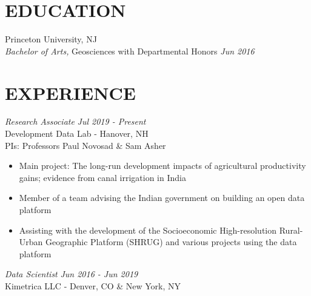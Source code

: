 \documentclass[overlapped, 11pt]{res} %
\begin{document}
\begin{resume}


\vspace{-20pt}
\section{EDUCATION}
Princeton University, NJ\\
{\sl Bachelor of Arts,} Geosciences with Departmental Honors  \hfill \emph{Jun 2016} \\ %

 \vspace{-15pt}
\section{EXPERIENCE}
{\sl Research Associate} \hfill \emph{Jul 2019 - Present}\\
Development Data Lab - Hanover, NH\\
PIs: Professors Paul Novosad \& Sam Asher

\begin{itemize} \itemsep -2pt %
\item Main project: The long-run development impacts of agricultural productivity gains; evidence from canal irrigation in India
\item Member of a team advising the Indian government on building an open data platform
\item Assisting with the development of the Socioeconomic High-resolution Rural-Urban Geographic Platform (SHRUG) and various projects using the data platform
\end{itemize}



{\sl Data Scientist} \hfill \emph{Jun 2016 - Jun 2019}\\
Kimetrica LLC - Denver, CO \& New York, NY


\end{resume}
\end{document}
